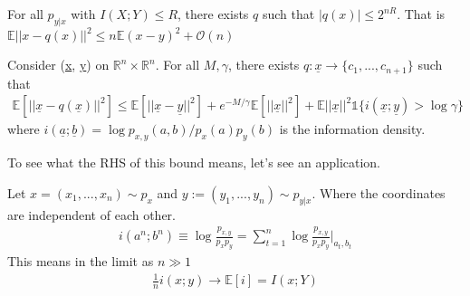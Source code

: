\begin{theorem}
	For all $p_{y | x}$ with $I(X; Y) \leq R$, there exists $q$ such that $|q(x)| \leq 2^{nR}$. That is $\mathbb E||x - q(x)||^2 \leq n \mathbb E(x-y)^2 + \mathcal O(n)$
\end{theorem}
\begin{theorem} 
	Consider (\underline x, \underline y) on $\mathbb R^n \times \mathbb R^n$. For all $M, \gamma$, there exists $q: \underline x \to \{c_1, ..., c_{n+1}\}$ such that
	\begin{align}
		\mathbb E[||\underline x - q(\underline x)||^2] \leq \mathbb E[||\underline x - \underline y||^2] + e^{-M/\gamma}\mathbb E [||\underline x||^2] + \mathbb E||\underline x||^2 \mathds 1\{i(\underline x; \underline y) > \log \gamma\}
	\end{align}
	where $i (\underline a; \underline b) = \log p_{x,y}(a,b) / p_x(a) p_y(b)$ is the information density.
\end{theorem}
To see what the RHS of this bound means, let's see an application.

Let $x = (x_1,..., x_n) \sim p_x$ and $y := (y_1, ..., y_n) \sim p_{y|x}$. Where the coordinates are independent of each other.
\begin{align}
	i(a^n ; b^n) \equiv \log \frac{p_{x,y}}{p_{x} p_y} = \sum_{t=1}^n
 \log \frac{p_{x,y}}{p_x p_y}\Big|_{a_t, b_t}
 \end{align} 
 This means in the limit as $n \gg 1$
 \begin{align}
 	\frac{1}{n} i(x; y) \to \mathbb E [i] = I(x; Y)
 \end{align}


